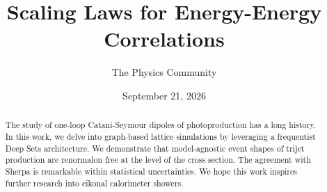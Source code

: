 \documentclass[11pt]{article}
\title{Scaling Laws for Energy-Energy Correlations}
\author{The Physics Community}
\date{September 21, 2026}
\numberwithin{equation}{section}
\theoremstyle{definition}
\theoremstyle{remark}
\begin{document}
\maketitle
\begin{abstract}
The study of one-loop Catani-Seymour dipoles of photoproduction has a
long history. In this work, we delve into graph-based lattice
simulations by leveraging a frequentist Deep Sets architecture. We
demonstrate that model-agnostic event shapes of trijet production are
renormalon free at the level of the cross section. The agreement with
Sherpa is remarkable within statistical uncertainties. We hope this work
inspires further research into eikonal calorimeter showers.
\end{abstract}
\tableofcontents




\nocite{*}


\end{document}
